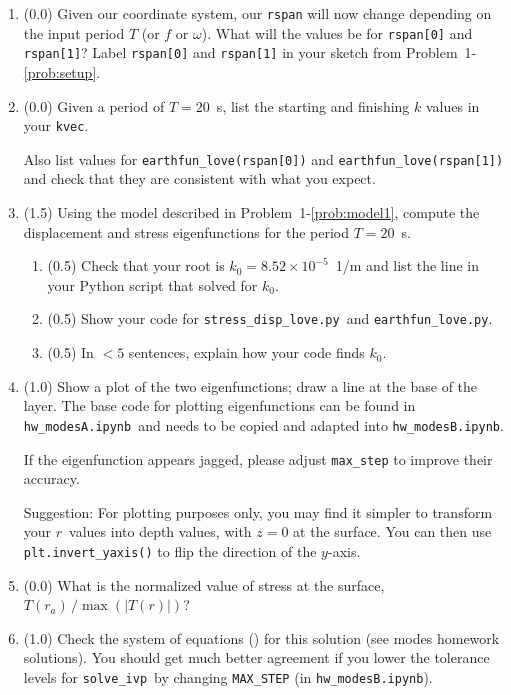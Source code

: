 \documentclass[11pt,titlepage,fleqn]{article}
\newcommand{\tfileA}{{\tt hw\_modesA.ipynb}}
\newcommand{\tfileAA}{{\tt hw\_modesB.ipynb}}
\newcommand{\tfileCC}{{\tt stress\_disp\_love.py}}
\newcommand{\tfileDD}{{\tt earthfun\_love.py}}
\newcommand{\sfind}{{\tt solve\_ivp}}
\begin{document}
\begin{enumerate}
\begin{enumerate}
\item (0.0) Given our coordinate system, our \verb+rspan+ will now change depending on the input period $T$ (or $f$ or $\omega$). What will the values be for \verb+rspan[0]+ and \verb+rspan[1]+? Label \verb+rspan[0]+ and \verb+rspan[1]+ in your sketch from Problem~1-\ref{prob:setup}.

\item (0.0) Given a period of $T = 20$~s, list the starting and finishing $k$ values in your \verb+kvec+.

Also list values for \verb+earthfun_love(rspan[0])+ and \verb+earthfun_love(rspan[1])+ and check that they are consistent with what you expect.

\item (1.5) Using the model described in Problem~1-\ref{prob:model1}, compute the displacement and stress eigenfunctions for the period $T = 20$~s.

\begin{enumerate}
\item (0.5) Check that your root is $k_0 = 8.52 \times 10^{-5}$~1/m and list the line in your Python script that solved for $k_0$.

\item (0.5) Show your code for \tfileCC\ and \tfileDD.

\item (0.5) In $<5$ sentences, explain how your code finds $k_0$.

\end{enumerate}

\item (1.0) Show a plot of the two eigenfunctions; draw a line at the base of the layer. The base code for plotting eigenfunctions can be found in \tfileA\ and needs to be copied and adapted into \tfileAA.

If the eigenfunction appears jagged, please adjust \verb+max_step+ to improve their accuracy.

Suggestion: For plotting purposes only, you may find it simpler to transform your $r$~values into depth values, with $z=0$ at the surface. You can then use \\ \verb+plt.invert_yaxis()+ to flip the direction of the $y$-axis.

\item (0.0) What is the normalized value of stress at the surface, $T(r_a)\,/\max(|T(r)|)$?

\item (1.0) Check the system of equations () for this solution (see modes homework solutions). You should get much better agreement if you lower the tolerance levels for \sfind\ by changing \verb+MAX_STEP+ (in \tfileAA).


\end{enumerate}
\end{enumerate}
\end{document}
